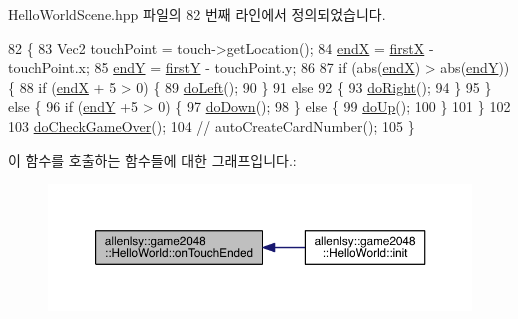 Hello\+World\+Scene.\+hpp 파일의 82 번째 라인에서 정의되었습니다.


\begin{DoxyCode}
82                                                                               \{
83         Vec2 touchPoint = touch->getLocation();
84         \hyperlink{classallenlsy_1_1game2048_1_1_hello_world_acc494c0862f1af7a4d4bd684fd89a439}{endX} = \hyperlink{classallenlsy_1_1game2048_1_1_hello_world_acba62073618cde47da3b85a856832e69}{firstX} - touchPoint.x;
85         \hyperlink{classallenlsy_1_1game2048_1_1_hello_world_a8227878cbc4805dc2afcfba9707705f7}{endY} = \hyperlink{classallenlsy_1_1game2048_1_1_hello_world_a077f4900c33ee54cd90fa6112ce720bb}{firstY} - touchPoint.y;
86         
87         \textcolor{keywordflow}{if} (abs(\hyperlink{classallenlsy_1_1game2048_1_1_hello_world_acc494c0862f1af7a4d4bd684fd89a439}{endX}) > abs(\hyperlink{classallenlsy_1_1game2048_1_1_hello_world_a8227878cbc4805dc2afcfba9707705f7}{endY})) \{
88             \textcolor{keywordflow}{if} (\hyperlink{classallenlsy_1_1game2048_1_1_hello_world_acc494c0862f1af7a4d4bd684fd89a439}{endX} + 5 > 0) \{
89                 \hyperlink{classallenlsy_1_1game2048_1_1_hello_world_a1c43b15b314d8d7efaae6f51bef14c56}{doLeft}();
90             \}
91             \textcolor{keywordflow}{else}
92             \{
93                 \hyperlink{classallenlsy_1_1game2048_1_1_hello_world_a7538c936591be5b39d45ca66ecf83726}{doRight}();
94             \}
95         \} \textcolor{keywordflow}{else} \{
96             \textcolor{keywordflow}{if} (\hyperlink{classallenlsy_1_1game2048_1_1_hello_world_a8227878cbc4805dc2afcfba9707705f7}{endY} +5 > 0) \{
97                 \hyperlink{classallenlsy_1_1game2048_1_1_hello_world_ad16dcf9910ecb3abdb12d87765032106}{doDown}();
98             \}    \textcolor{keywordflow}{else} \{
99                 \hyperlink{classallenlsy_1_1game2048_1_1_hello_world_aae4ae74d9bc2be114ec52610f3ef3fcc}{doUp}();
100             \}
101         \}
102         
103         \hyperlink{classallenlsy_1_1game2048_1_1_hello_world_a4f9c99959e2c14cd349470d305909fca}{doCheckGameOver}();
104         \textcolor{comment}{//    autoCreateCardNumber();}
105     \}
\end{DoxyCode}
이 함수를 호출하는 함수들에 대한 그래프입니다.\+:
\nopagebreak
\begin{figure}[H]
\begin{center}
\leavevmode
\includegraphics[width=350pt]{d5/d2b/classallenlsy_1_1game2048_1_1_hello_world_a99042e68bb9365cdb764cc9c3d9e6197_icgraph}
\end{center}
\end{figure}


